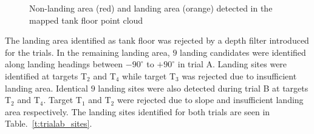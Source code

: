 \begin{figure}[!ht]
\centering
{}\quad
{}
\caption{Non-landing area (red) and landing area (orange) detected in the mapped tank floor point cloud}
\end{figure}

The landing area identified as tank floor was rejected by a depth filter introduced for the trials. In the remaining landing area, $9$ landing candidates were identified along landing headings between $-90^\circ$ to $+90^\circ$ in trial A. Landing sites were identified at targets T$_2$ and T$_4$ while target T$_3$ was rejected due to insufficient landing area. Identical $9$ landing sites were also detected during trial B at targets T$_2$ and T$_4$. Target T$_1$ and T$_2$ were rejected due to slope and insufficient landing area respectively. The landing sites identified for both trials are seen in Table.~\ref{t:trialab_sites}. 


